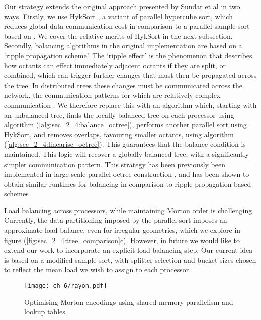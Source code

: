 Our strategy extends the original approach presented by Sundar et al in two ways. Firstly, we use HykSort \cite{sundar2013hyksort}, a variant of parallel hypercube sort, which reduces global data communication cost in comparison to a parallel sample sort based on . We cover the relative merits of HykSort in the next subsection. Secondly, balancing algorithms in the original implementation are based on a `ripple propagation scheme'. The `ripple effect' is the phenomenon that describes how octants can effect immediately adjacent octants if they are split, or combined, which can trigger further changes that must then be propagated across the tree. In distributed trees these changes must be communicated across the network, the communication patterns for which are relatively complex communication \cite{tu2005scalable,sundar2008bottom}. We therefore replace this with an algorithm which, starting with an unbalanced tree, finds the locally balanced tree on each processor using algorithm (\ref{alg:sec_2_4:balance_octree}), performs another parallel sort using HykSort, and removes overlaps, favouring smaller octants, using algorithm (\ref{alg:sec_2_4:linearise_octree}). This guarantees that the balance condition is maintained. This logic will recover a globally balanced tree, with a significantly simpler communication pattern. This strategy has been previously been implemented in large scale parallel octree construction \cite{malhotra2015pvfmm}, and has been shown to obtain similar runtimes for balancing in comparison to ripple propagation based schemes \cite{suh2020evaluation}.

Load balancing across processors, while maintaining Morton order is challenging. Currently, the data partitioning imposed by the parallel sort imposes an approximate load balance, even for irregular geometries, which we explore in figure (\ref{fig:sec_2_4:tree_comparison}c). However, in future we would like to extend our work to incorporate an explicit load balancing step. Our current idea is based on a modified sample sort, with splitter selection and bucket sizes chosen to reflect the mean load we wish to assign to each processor.

\begin{figure}
    \centerline{\texttt{[image: ch\_6/rayon.pdf]}}
    \caption{Optimising Morton encodings using shared memory parallelism and lookup tables.}
    \label{fig:sec_2_4:rayon}
\end{figure}

